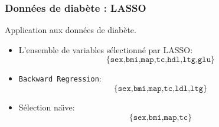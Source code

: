 \documentclass{beamer}
\begin{document}
\begin{frame}
\frametitle{Données de diab\`ete : LASSO}

Application aux données de diab\`ete.

\begin{itemize}
\item  L'ensemble de variables sélectionné par LASSO:
$$
\{\texttt{sex,bmi,map,tc,hdl,ltg,glu}\}
$$
\item \texttt{Backward Regression}:
$$
\{\texttt{sex,bmi,map,tc,ldl,ltg}\}
$$
\item Sélection na\"{\i}ve:
$$
\{\texttt{sex,bmi,map,tc}\}
$$
\end{itemize}
\end{frame}


\end{document}
